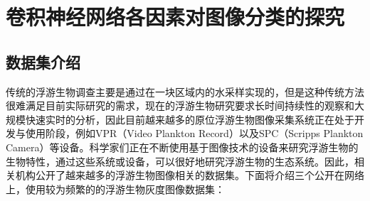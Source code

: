 \chapter{卷积神经网络各因素对图像分类的探究}

\section{数据集介绍}

传统的浮游生物调查主要是通过在一块区域内的水采样实现的，但是这种传统方法很难满足目前实际研究的需求，现在的浮游生物研究要求长时间持续性的观察和大规模快速实时的分析，因此目前越来越多的原位浮游生物图像采集系统正在处于开发与使用阶段，例如VPR（Video Plankton Record）\cite{davis2005three}以及SPC（Scripps Plankton Camera）\cite{benfield2007rapid}等设备。科学家们正在不断使用基于图像技术的设备来研究浮游生物的生物特性，通过这些系统或设备，可以很好地研究浮游生物的生态系统。因此，相关机构公开了越来越多的浮游生物图像相关的数据集。下面将介绍三个公开在网络上，使用较为频繁的的浮游生物灰度图像数据集：

